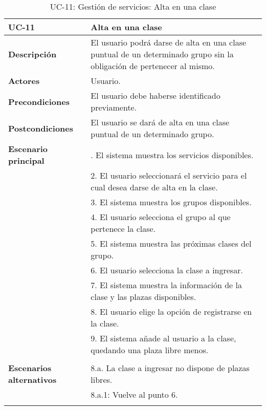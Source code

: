 \begin{table}[H]
  \begin{center}
    \begin{tabularx}{16.4cm}{|l|X|}
      \hline
      \textbf{UC-11} & \textbf{Alta en una clase}\\
      \hline
      \textbf{Descripción} & El usuario podrá darse de alta en una clase puntual de un determinado grupo sin la obligación de pertenecer al mismo.\\
      \hline
      \textbf{Actores} & Usuario.\\
      \hline
      \textbf{Precondiciones} & El usuario debe haberse identificado previamente.\\
      \hline
      \textbf{Postcondiciones} & El usuario se dará de alta en una clase puntual de un determinado grupo.\\
      \hline
      \textbf{Escenario principal} & \smallskip 1. El sistema muestra los servicios disponibles.\\
      & 2. El usuario seleccionará el servicio para el cual desea darse de alta en la clase.\\
      & 3. El sistema muestra los grupos disponibles.\\
      & 4. El usuario selecciona el grupo al que pertenece la clase. \\
      & 5. El sistema muestra las próximas clases del grupo.\\
      & 6. El usuario selecciona la clase a ingresar.\\
      & 7. El sistema muestra la información de la clase y las plazas disponibles.\\
      & 8. El usuario elige la opción de registrarse en la clase.\\
      & 9. El sistema añade al usuario a la clase, quedando una plaza libre menos.\\
      & \\
      \hline
      \textbf{Escenarios alternativos} & \smallskip 8.a. La clase a ingresar no dispone de plazas libres.\\
      & \hspace{0.3cm} 8.a.1: Vuelve al punto 6. \\
      & \\
      \hline
    \end{tabularx}
    \caption{UC-11: Gestión de servicios: Alta en una clase}
  \end{center}
\end{table}


